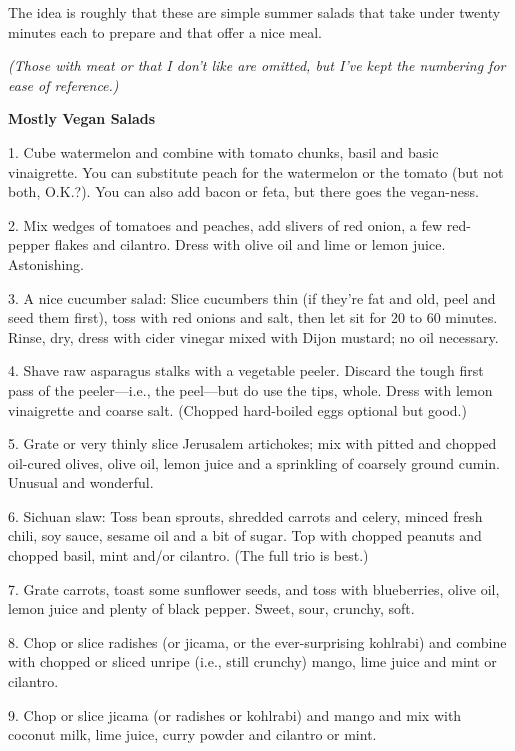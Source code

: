 
The idea is roughly that these are simple summer salads that take
under twenty minutes each to prepare and that offer a nice meal.

{\footnotesize \textit{(Those with meat or that I don't like are
    omitted, but I've kept the numbering for ease of reference.)}}

\begin{recipe}

\textbf{Mostly Vegan Salads}

1. Cube watermelon and combine with tomato chunks, basil and basic
vinaigrette. You can substitute peach for the watermelon or the tomato
(but not both, O.K.?). You can also add bacon or feta, but there goes
the vegan-ness.

2. Mix wedges of tomatoes and peaches, add slivers of red onion, a few
red-pepper flakes and cilantro. Dress with olive oil and lime or lemon
juice. Astonishing.

3. A nice cucumber salad: Slice cucumbers thin (if they're fat and
old, peel and seed them first), toss with red onions and salt, then
let sit for 20 to 60 minutes. Rinse, dry, dress with cider vinegar
mixed with Dijon mustard; no oil necessary.

4. Shave raw asparagus stalks with a vegetable peeler. Discard the
tough first pass of the peeler---i.e., the peel---but do use the tips,
whole. Dress with lemon vinaigrette and coarse salt. (Chopped
hard-boiled eggs optional but good.)

5. Grate or very thinly slice Jerusalem artichokes; mix with pitted
and chopped oil-cured olives, olive oil, lemon juice and a sprinkling
of coarsely ground cumin. Unusual and wonderful.

6. Sichuan slaw: Toss bean sprouts, shredded carrots and celery,
minced fresh chili, soy sauce, sesame oil and a bit of sugar. Top with
chopped peanuts and chopped basil, mint and/or cilantro. (The full
trio is best.)

7. Grate carrots, toast some sunflower seeds, and toss with
blueberries, olive oil, lemon juice and plenty of black pepper. Sweet,
sour, crunchy, soft.

8. Chop or slice radishes (or jicama, or the ever-surprising kohlrabi)
and combine with chopped or sliced unripe (i.e., still crunchy) mango,
lime juice and mint or cilantro.

9. Chop or slice jicama (or radishes or kohlrabi) and mango and mix
with coconut milk, lime juice, curry powder and cilantro or mint.


\end{recipe}

